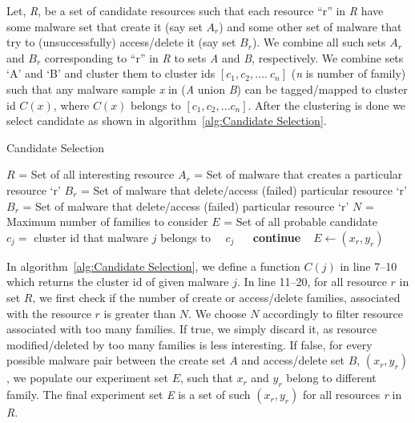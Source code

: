 Let, \emph{R}, be a set of candidate resources such that each resource ``r'' in \emph{R} have some malware set that create it (say set $A_r$) and some other set of malware that try to (unsuccessfully) access/delete it (say set $B_r$).
We combine all such sets $A_r$ and $B_r$ corresponding to ``r'' in \emph{R} to sets \emph{A} and \emph{B}, respectively.
We combine sets `A' and `B' and cluster them to cluster ids $[c_1,c_2,\ldots.\ c_n]$ (\emph{n} is number of family) such that any malware sample \emph{x} in (\emph{A} union \emph{B}) can be tagged/mapped to cluster id $C(x)$, where $C(x)$ belongs to $[c_1, c_2, \ldots c_n]$.
After the clustering is done we select candidate as shown in algorithm~\autoref{alg:Candidate Selection}.
\begin{algorithm}[ht]
\caption{Candidate Selection}
\label{alg:Candidate Selection}
\begin{algorithmic}[1]
    \State$R$   = Set of all interesting resource
    \State$A_r$ = Set of malware that creates a particular resource `r'
    \State$B_r$ = Set of malware that delete/access (failed) particular resource `r'
    \State$B_r$ = Set of malware that delete/access (failed) particular resource `r'
    \State$N$   = Maximum number of families to consider
    \State$E$   = Set of all probable candidate
      \State\ $c_j =$ cluster id that malware $j$ belongs to
      \State\ \Return\ $c_j$
    \EndFunction\
        \State\ \textbf{continue}
      \EndIf\
          \State$E\gets (x_r, y_r)$
        \EndIf\
      \EndFor\
    \EndFor\
  \end{algorithmic}
\end{algorithm}

In algorithm~\autoref{alg:Candidate Selection}, we define a function $C(j)$ in line 7--10 which returns the cluster id of given malware $j$.
In line 11--20, for all resource $r$ in set $R$, we first check if the number of create or access/delete families, associated with the resource $r$ is greater than $N$.
We choose $N$ accordingly to filter resource associated with too many families.
If true, we simply discard it, as resource modified/deleted by too many families is less interesting.
If false, for every possible malware pair between the create set $A$ and access/delete set $B$, $(x_r,y_r)$, we populate our experiment set $E$, such that $x_r$ and $y_r$ belong to different family.
The final experiment set \emph{E} is a set of such $(x_r, y_r)$ for all resources \emph{r} in \emph{R}.

